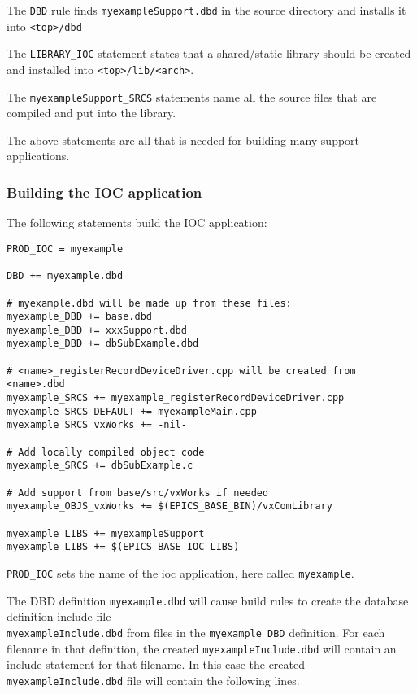 The \verb|DBD| rule finds \verb|myexampleSupport.dbd| in the source directory and installs it into \verb|<top>/dbd|

The \verb|LIBRARY_IOC| statement states that a shared/static library should be created and installed into \verb|<top>/lib/<arch>|.

The \verb|myexampleSupport_SRCS| statements name all the source files that are compiled and put into the library.

The above statements are all that is needed for building many support applications.

\subsubsection{Building the IOC application}

The following statements build the IOC application:

\begin{verbatim}
PROD_IOC = myexample

DBD += myexample.dbd

# myexample.dbd will be made up from these files:
myexample_DBD += base.dbd
myexample_DBD += xxxSupport.dbd
myexample_DBD += dbSubExample.dbd

# <name>_registerRecordDeviceDriver.cpp will be created from <name>.dbd
myexample_SRCS += myexample_registerRecordDeviceDriver.cpp
myexample_SRCS_DEFAULT += myexampleMain.cpp
myexample_SRCS_vxWorks += -nil-

# Add locally compiled object code
myexample_SRCS += dbSubExample.c

# Add support from base/src/vxWorks if needed
myexample_OBJS_vxWorks += $(EPICS_BASE_BIN)/vxComLibrary

myexample_LIBS += myexampleSupport
myexample_LIBS += $(EPICS_BASE_IOC_LIBS)
\end{verbatim}

\verb|PROD_IOC| sets the name of the ioc application, here called \verb|myexample|.

The DBD definition \verb|myexample.dbd| will cause build rules to create the database definition include file \\
\verb|myexampleInclude.dbd| from files in the \verb|myexample_DBD| definition. For each filename in that
definition, the created \verb|myexampleInclude.dbd| will contain an include statement for that filename.
In this case the created \verb|myexampleInclude.dbd| file will contain the following lines.

